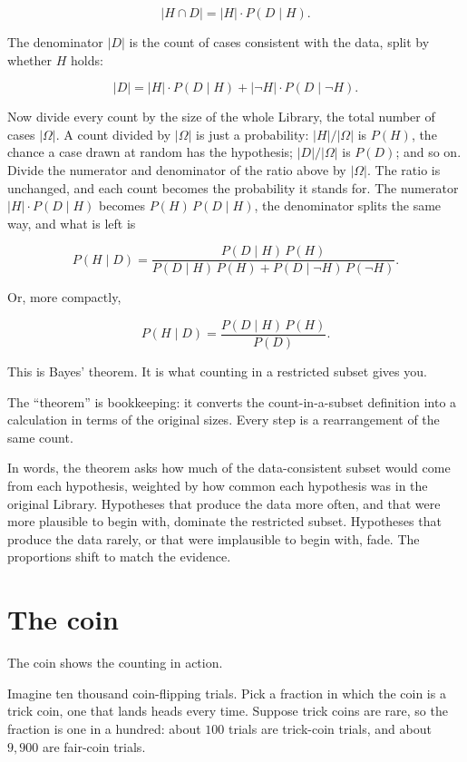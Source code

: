 $$|H \cap D| = |H| \cdot P(D \mid H).$$

The denominator $|D|$ is the count of cases consistent with the data, split by whether $H$ holds:

$$|D| = |H| \cdot P(D \mid H) + |\neg H| \cdot P(D \mid \neg H).$$

Now divide every count by the size of the whole Library, the total number of cases $|\Omega|$. A count divided by $|\Omega|$ is just a probability: $|H|/|\Omega|$ is $P(H)$, the chance a case drawn at random has the hypothesis; $|D|/|\Omega|$ is $P(D)$; and so on. Divide the numerator and denominator of the ratio above by $|\Omega|$. The ratio is unchanged, and each count becomes the probability it stands for. The numerator $|H| \cdot P(D \mid H)$ becomes $P(H) \, P(D \mid H)$, the denominator splits the same way, and what is left is

$$P(H \mid D) = \frac{P(D \mid H) \, P(H)}{P(D \mid H) \, P(H) + P(D \mid \neg H) \, P(\neg H)}.$$

Or, more compactly,

$$P(H \mid D) = \frac{P(D \mid H) \, P(H)}{P(D)}.$$

This is Bayes' theorem. It is what counting in a restricted subset gives you.

The ``theorem'' is bookkeeping: it converts the count-in-a-subset definition into a calculation in terms of the original sizes. Every step is a rearrangement of the same count.

In words, the theorem asks how much of the data-consistent subset would come from each hypothesis, weighted by how common each hypothesis was in the original Library. Hypotheses that produce the data more often, and that were more plausible to begin with, dominate the restricted subset. Hypotheses that produce the data rarely, or that were implausible to begin with, fade. The proportions shift to match the evidence.

\section*{The coin}

The coin shows the counting in action.

Imagine ten thousand coin-flipping trials. Pick a fraction in which the coin is a trick coin, one that lands heads every time. Suppose trick coins are rare, so the fraction is one in a hundred: about $100$ trials are trick-coin trials, and about $9{,}900$ are fair-coin trials.

